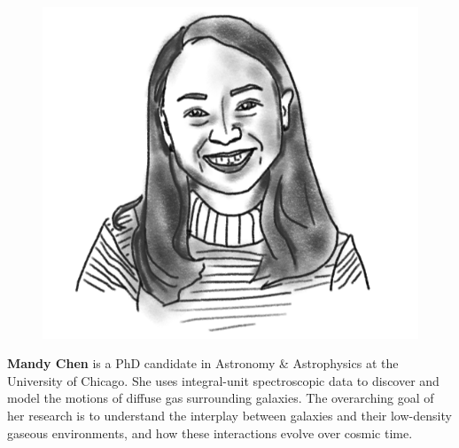 \begin{figure}
\includegraphics[width=0.9\linewidth]{portraits/mandy.png}
\end{figure}
\textbf{Mandy Chen} is a PhD candidate in Astronomy \& Astrophysics at the University of Chicago. She uses integral-unit spectroscopic data to discover and model the motions of diffuse gas surrounding galaxies.  The overarching goal of her research is to understand the interplay between galaxies and their low-density gaseous environments, and how these interactions evolve over cosmic time.\\
\\

